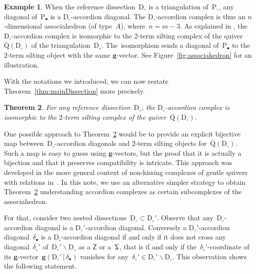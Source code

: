 \documentclass{compositio}
\newtheorem{theorem}{Theorem}%
\theoremstyle{definition}
\newtheorem{example}[theorem]{Example}
\renewcommand{\b}[1]{\mathbf{#1}} %
\newcommand{\ssm}{\smallsetminus} %
\newcommand{\fref}[1]{Figure~\ref{#1}} %
\newcommand{\polygon}{\mathrm{P}} %
\newcommand{\dissection}{\mathrm{D}} %
\newcommand{\SSS}{\reflectbox{$\mathsf{Z}$}} %
\newcommand{\ZZZ}{\mathsf{Z}} %
\newcommand{\gvector}[2]{\mathbf{g}(#1 \,|\, #2)} %
\newcommand{\quiver}{\mathrm{Q}} %
\begin{document}
\begin{example}
\label{exm:associahedron}
When the reference dissection~$\dissection_\circ$ is a triangulation of~$\polygon_\circ$, any diagonal of~$\polygon_\bullet$ is a $\dissection_\circ$-accordion diagonal.
The $\dissection_\circ$-accordion complex is thus an $n$-dimensional associahedron (of type~$A$), where~$n = m-3$.
As explained in \cite{CalderoChapotonSchiffler}, the $\dissection_\circ$-accordion complex is isomorphic to the $2$-term silting complex of the quiver~$\overline{\quiver}(\dissection_\circ)$ of the triangulation~$\dissection_\circ$.
The~isomorphism sends a diagonal of~$\polygon_\bullet$ to the $2$-term silting object with the same $\b{g}$-vector.
See \fref{fig:associahedron} for an illustration.
\end{example}

With the notations we introduced, we can now restate Theorem~\ref{thm:mainDissection} more precisely.

\begin{theorem}
\label{thm:bijectionAccordionComplexSiltingComplex}
For any reference dissection~$\dissection_\circ$, the $\dissection_\circ$-accordion complex is isomorphic to the $2$-term silting complex of the quiver~$\overline{\quiver}(\dissection_\circ)$.
\end{theorem}

One possible approach to Theorem~\ref{thm:bijectionAccordionComplexSiltingComplex} would be to provide an explicit bijective map between~$\dissection_\circ$-accordion diagonals and $2$-term silting objects for~$\overline{\quiver}(\dissection_\circ)$.
Such a map is easy to guess using \mbox{$\b{g}$-vectors}, but the proof that it is actually a bijection and that it preserves compatibility is intricate.
This approach was developed in the more general context of non-kissing complexes of gentle quivers with relations in~\cite{PaluPilaudPlamondon}.
In this note, we use an alternative simpler strategy to obtain Theorem~\ref{thm:bijectionAccordionComplexSiltingComplex} understanding accordion complexes as certain subcomplexes of the associahedron.

For that, consider two nested dissections~$\dissection_\circ \subset \dissection_\circ'$.
Observe that any~$\dissection_\circ$-accordion diagonal is a $\dissection_\circ'$-accordion diagonal.
Conversely a $\dissection_\circ'$-accordion diagonal~$\delta_\bullet$ is a $\dissection_\circ$-accordion diagonal if and only if it does not cross any diagonal~$\delta_\circ'$ of~$\dissection_\circ' \ssm \dissection_\circ$ as a $\ZZZ$ or a~$\SSS$, that is if and only if the~$\delta_\circ'$-coordinate of its $\b{g}$-vector~$\gvector{\dissection_\circ'}{\delta_\bullet}$ vanishes for any~$\delta_\circ' \in \dissection_\circ' \ssm \dissection_\circ$.
This observation shows the following statement.
\end{document}
